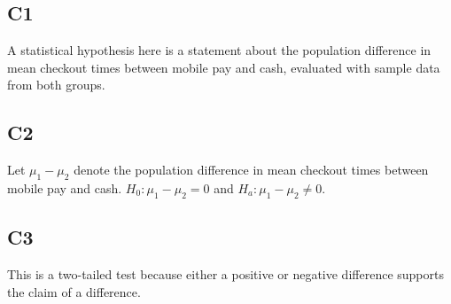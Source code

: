 \begin{ExamProblems}
		\subsection*{C1}
		A statistical hypothesis here is a statement about the population difference in mean checkout times between mobile pay and cash, evaluated with sample data from both groups.

		\subsection*{C2}
		Let \(\mu_1-\mu_2\) denote the population difference in mean checkout times between mobile pay and cash. \(H_0\colon \mu_1-\mu_2 = 0\) and \(H_a\colon \mu_1-\mu_2 \neq 0\).

		\subsection*{C3}
		This is a two-tailed test because either a positive or negative difference supports the claim of a difference.

	\end{ExamProblems}

